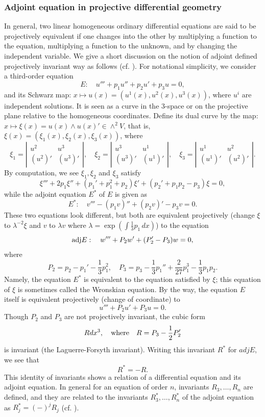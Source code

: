 \documentclass[a4paper,12pt]{article}
\theoremstyle{definition}
\theoremstyle{remark}
\numberwithin{equation}{section} %
\begin{document}
\subsubsection{Adjoint equation in projective differential geometry}\label{GenAdjPrj}
In general, two linear homogeneous ordinary differential equations are said to be projectively equivalent if one changes into the other by multiplying a function to the equation, multiplying a function to the unknown, and by changing the independent variable. 
We give a short discussion on the notion of adjoint defined
projectively invariant way as follows (cf. \cite{Wil}).
For notational simplicity, we consider a third-order equation
  \[E: \quad u'''+p_1u''+p_2u'+p_3u=0,\]
and its Schwarz map: $x\mapsto u(x)=(u^1(x),u^2(x),u^3(x))$,
where $u^i$ are independent solutions. It is seen as a curve in the 3-space
or on the projective plane relative to the homogeneous coordinates.
Define its dual curve by the map:
$x\mapsto \xi(x)= u(x)\wedge u(x)' \in \wedge^2 V$, that is,
$\xi(x)=(\xi_1(x),\xi_2(x),\xi_3(x))$, where
\[ \xi_1=
  \left|\begin{array}{cc}u^2&u^3\\(u^2)'&(u^3)'\end{array}\right|, \quad
   \xi_2=\left|\begin{array}{cc}u^3&u^1\\(u^3)'&(u^1)'\end{array}\right|, \quad
   \xi_3=\left|\begin{array}{cc}u^1&u^2\\(u^1)'&(u^2)'\end{array}\right|.\]
By computation, we see $\xi_1,\xi_2$ and $\xi_3$ satisfy
  \[\xi'''+2p_1\xi''+(p_1'+p_1^2+p_2)\xi'+(p_2'+p_1p_2-p_3)\xi =0,\]
while the adjoint equation $E^*$  of $E$ is given as
  \[E^*:  \quad v'''-(p_1v)''+(p_2v)'-p_3v=0.\]
These two equations look different, but both are equivalent
projectively (change $\xi$ to $\lambda^{-2}\xi$ and
$v$ to $\lambda v$ where
$\lambda=\exp(\int\frac{1}{3}p_1\, dx)$) to the equation
  \[{\rm adj}E:\quad w'''+P_2w'+(P_2'-P_3)w=0,\] %
where
  \[P_2=p_2-p_1'-\frac{1}{3}p_1^2, \quad
    P_3=p_3-\frac{1}{3}p_1''+\frac{2}{27}p_1^3-\frac{1}{3}p_1p_2.\]
Namely, the equation $E^*$ is equivalent to the equation satisfied
by $\xi$; this equation of $\xi$ is sometimes called the
Wronskian equation. By the way, the equation $E$ itself is %
equivalent projectively (change of coordinate) to
  \[   u'''+P_2u'+P_3u=0.\] %
Though $P_2$ and $P_3$ are not projectively invariant, the cubic form
  \[ Rdx^3,\quad{\rm where}\quad R=P_3-\frac12 P_2'\]
is invariant (the Laguerre-Forsyth invariant).
Writing this invariant $R^*$ for $adjE$, we see that 
  \[R^*=-R.\]
This identity of invariants shows a relation of a differential equation
and its adjoint equation. In general for an equation of order $n$,
invariants $R_3,\dots,R_n$ are defined,
and they are related to the invariants $R^*_3,\dots,R^*_n$
of the adjoint equation as $R_j^*=(-)^jR_j$ (cf. \cite{Wil}).
\end{document}
